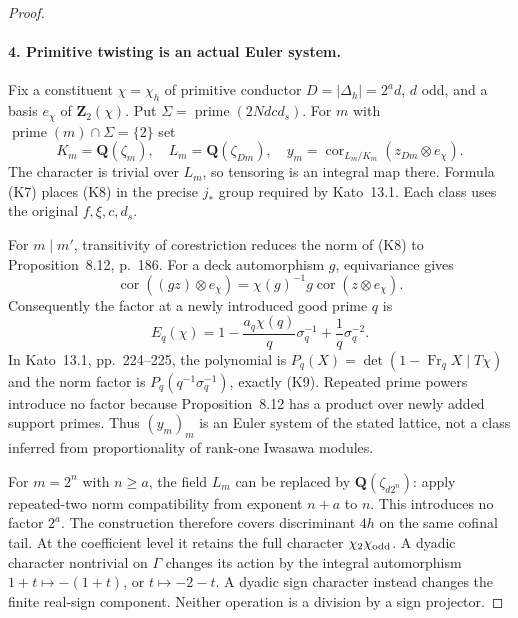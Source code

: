 \documentclass[11pt]{article}
\theoremstyle{definition}
\theoremstyle{remark}
\begin{document}
\begin{proof}
\paragraph{4. Primitive twisting is an actual Euler system.}
Fix a constituent $\chi=\chi_h$ of primitive conductor
$D=|\Delta_h|=2^a d$, $d$ odd, and a basis $e_\chi$ of
$\mathbf Z_2(\chi)$. Put
$\Sigma=\operatorname{prime}(2Ndcd_s)$.
For $m$ with $\operatorname{prime}(m)\cap\Sigma=\{2\}$ set
\[
 K_m=\mathbf Q(\zeta_m),\quad
 L_m=\mathbf Q(\zeta_{Dm}),\quad
 y_m=\operatorname{cor}_{L_m/K_m}
             (z_{Dm}\otimes e_\chi).                      \tag{K8}
\]
The character is trivial over $L_m$, so tensoring is an integral
map there. Formula (K7) places (K8) in the precise $j_*$ group
required by Kato~13.1. Each class uses the original $f,\xi,c,d_s$.

For $m\mid m'$, transitivity of corestriction reduces the norm
of (K8) to Proposition~8.12, p.~186. For a deck automorphism $g$,
equivariance gives
\[
 \operatorname{cor}((gz)\otimes e_\chi)
       =\chi(g)^{-1}g\operatorname{cor}(z\otimes e_\chi).
\]
Consequently the factor at a newly introduced good prime $q$ is
\[
 E_q(\chi)=1-\frac{a_q\chi(q)}q\sigma_q^{-1}
                         +\frac1q\sigma_q^{-2}.           \tag{K9}
\]
In Kato~13.1, pp.~224--225, the polynomial is
$P_q(X)=\det(1-\operatorname{Fr}_qX\mid T\chi)$ and the norm
factor is $P_q(q^{-1}\sigma_q^{-1})$, exactly (K9).
Repeated prime powers introduce no factor because Proposition~8.12
has a product over newly added support primes. Thus $(y_m)_m$ is
an Euler system of the stated lattice, not a class inferred from
proportionality of rank-one Iwasawa modules.

For $m=2^n$ with $n\geq a$, the field $L_m$ can be replaced by
$\mathbf Q(\zeta_{d2^n})$: apply repeated-two norm compatibility
from exponent $n+a$ to $n$. This introduces no factor $2^a$.
The construction therefore covers discriminant $4h$ on the same
cofinal tail. At the coefficient level it retains the full character
$\chi_2\chi_{\rm odd}$. A dyadic character nontrivial on $\Gamma$
changes its action by the integral automorphism
$1+t\mapsto-(1+t)$, or $t\mapsto-2-t$. A dyadic sign character
instead changes the finite real-sign component. Neither operation
is a division by a sign projector.


\end{proof}
\end{document}
